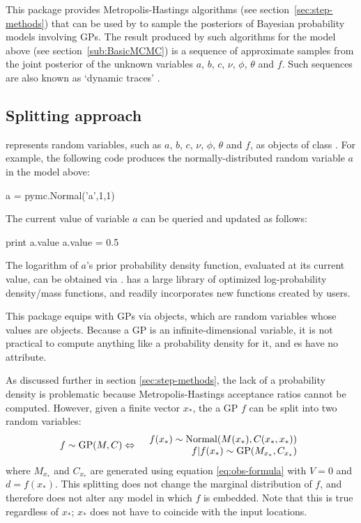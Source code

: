 \documentclass[article]{jss}
\begin{document}
This package provides Metropolis-Hastings algorithms (see section~\ref{sec:step-methods}) that can be used by  \citep{pymc} to sample the posteriors of Bayesian probability models involving GPs. The result produced by such algorithms for the model above (see section~\ref{sub:BasicMCMC}) is a sequence of approximate samples from the joint posterior of the unknown variables $a$, $b$, $c$, $\nu$, $\phi$, $\theta$ and $f$. Such sequences are also known as  `dynamic traces' \citep{gamerman}. 

\subsection{Splitting approach} 
 represents random variables, such as $a$, $b$, $c$, $\nu$, $\phi$, $\theta$ and $f$, as objects of class . For example, the following code produces the normally-distributed random variable $a$ in the model above:
\begin{CodeChunk}
\begin{CodeInput}
a = pymc.Normal('a',1,1)
\end{CodeInput}
\end{CodeChunk}
The current value of variable $a$ can be queried and updated as follows:
\begin{CodeChunk}
\begin{CodeInput}
print a.value
a.value = 0.5
\end{CodeInput}
\end{CodeChunk}
The logarithm of $a$'s prior probability density function, evaluated at its current value, can be obtained via .  has a large library of optimized log-probability density/mass functions, and readily incorporates new functions created by users.

This package equips  with GPs via  objects, which are random variables whose values are  objects. Because a GP is an infinite-dimensional variable, it is not practical to compute anything like a probability density for it, and es have no  attribute.

As discussed further in section \ref{sec:step-methods}, the lack of a probability density is problematic because Metropolis-Hastings acceptance ratios cannot be computed. However, given a finite vector $x_*$, the a GP $f$ can be split into two random variables:
\begin{eqnarray*}
    f\sim\textup{GP}(M,C) & \Leftrightarrow & \begin{array}{r}
        f(x_*)\sim\textup{Normal}(M(x_*), C(x_*,x_*))\\
        f|f(x_*)\sim\textup{GP}(M_{x_*}, C_{x_*})
    \end{array}
\end{eqnarray*}
where $M_{x_*}$ and $C_{x_*}$ are generated using equation \ref{eq:obs-formula} with $V=0$ and $d=f(x_*)$. This splitting does not change the marginal distribution of $f$, and therefore does not alter any model in which $f$ is embedded. Note that this is true regardless of $x_*$; $x_*$ does not have to coincide with the input locations.
\end{document}
